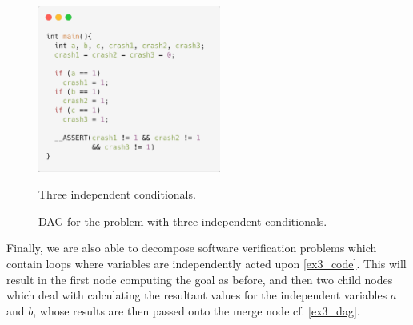 \documentclass[
10pt, %
a4paper, %
oneside, %
headinclude,footinclude, %
BCOR5mm, %
]{scrartcl}
\begin{document}
\begin{figure}
    \centering
    \begin{minipage}{0.45\textwidth}
        \centering

  \includegraphics[width=6cm]{./figs/ex2_code.png}
  \caption{Three independent conditionals.}
  \label{ex2_code}

    \end{minipage}\hfill
    \begin{minipage}{0.45\textwidth}
        \centering

  \caption{DAG for the problem with three independent conditionals.}
  \label{ex2_dag}


    \end{minipage}
\end{figure}



Finally, we are also able to decompose software verification problems which contain loops where variables are independently acted upon \ref{ex3_code}. This will result in the first node computing the goal as before, and then two child nodes which deal with calculating the resultant values for the independent variables $a$ and $b$, whose results are then passed onto the merge node cf. \ref{ex3_dag}. 
\end{document}
